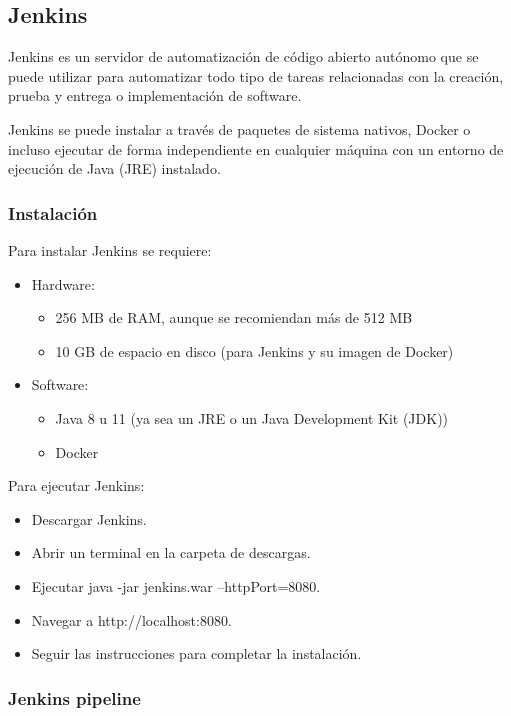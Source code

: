 \documentclass[twoside,twocolumn]{article}
\begin{document}
\subsection{Jenkins}

Jenkins es un servidor de automatización de código abierto autónomo que se puede utilizar para automatizar todo tipo de tareas relacionadas con la creación, prueba y entrega o implementación de software.

Jenkins se puede instalar a través de paquetes de sistema nativos, Docker o incluso ejecutar de forma independiente en cualquier máquina con un entorno de ejecución de Java (JRE) instalado.

\subsubsection{Instalación}

Para instalar Jenkins se requiere:

\begin{itemize}
    \item Hardware:
    \begin{itemize}
        \item 256 MB de RAM, aunque se recomiendan más de 512 MB
        \item 10 GB de espacio en disco (para Jenkins y su imagen de Docker)
    \end{itemize}
    \item Software:
    \begin{itemize}
        \item Java 8 u 11 (ya sea un JRE o un Java Development Kit (JDK))
        \item Docker
    \end{itemize}
\end{itemize}

Para ejecutar Jenkins:

\begin{itemize}
    \item Descargar Jenkins.
    \item Abrir un terminal en la carpeta de descargas.
    \item Ejecutar java -jar jenkins.war --httpPort=8080.
    \item Navegar a http://localhost:8080.
    \item Seguir las instrucciones para completar la instalación.
\end{itemize}

\subsubsection{Jenkins pipeline}
\end{document}
